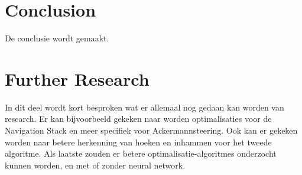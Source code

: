 \documentclass[conference,a4paper]{IEEEtran}
\begin{document}
\section{Conclusion}
De conclusie wordt gemaakt.

\section{Further Research}
In dit deel wordt kort besproken wat er allemaal nog gedaan kan worden van research. Er kan bijvoorbeeld gekeken naar worden optimalisaties voor de Navigation Stack en meer specifiek voor Ackermannsteering. Ook kan er gekeken worden naar betere herkenning van hoeken en inhammen voor het tweede algoritme. Als laatste zouden er betere optimalisatie-algoritmes onderzocht kunnen worden, en met of zonder neural network. 


%
%
%



\newpage


%




\end{document}

